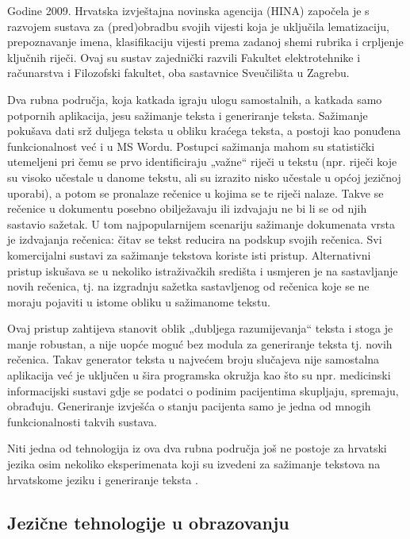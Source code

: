\begin{multicols}{2}
Godine 2009. Hrvatska izvještajna novinska agencija (HINA) \cite{str25} započela je s razvojem sustava za (pred)obradbu svojih vijesti koja je uključila lematizaciju, prepoznavanje imena, klasifikaciju vijesti prema zadanoj shemi rubrika i crpljenje ključnih riječi. Ovaj su sustav zajednički razvili Fakultet elektrotehnike i računarstva \cite{str26} i Filozofski fakultet, oba sastavnice Sveučilišta u Zagrebu.

Dva rubna područja, koja katkada igraju ulogu samostalnih, a katkada samo potpornih aplikacija, jesu sažimanje teksta i generiranje teksta. Sažimanje pokušava dati srž duljega teksta u obliku kraćega teksta, a postoji kao ponuđena funkcionalnost već i u MS Wordu. Postupci sažimanja mahom su statistički utemeljeni pri čemu se prvo identificiraju „važne“ riječi u tekstu (npr. riječi koje su visoko učestale u danome tekstu, ali su izrazito nisko učestale u općoj jezičnoj uporabi), a potom se pronalaze rečenice u kojima se te riječi nalaze. Takve se rečenice u dokumentu posebno obilježavaju ili izdvajaju ne bi li se od njih sastavio sažetak. U tom najpopularnijem scenariju sažimanje dokumenata vrsta je izdvajanja rečenica: čitav se tekst reducira na podskup svojih rečenica. Svi komercijalni sustavi za sažimanje tekstova koriste isti pristup. Alternativni pristup iskušava se u nekoliko istraživačkih središta i usmjeren je na sastavljanje novih rečenica, tj. na izgradnju sažetka sastavljenog od rečenica koje se ne moraju pojaviti u istome obliku u sažimanome tekstu.


Ovaj pristup zahtijeva stanovit oblik „dubljega razumijevanja“ teksta i stoga je manje robustan, a nije uopće moguć bez modula za generiranje teksta tj. novih rečenica. Takav generator teksta u najvećem broju slučajeva nije samostalna aplikacija već je uključen u šira programska okružja kao što su npr. medicinski informacijski sustavi gdje se podatci o podinim pacijentima skupljaju, spremaju, obrađuju. Generiranje izvješća o stanju pacijenta samo je jedna od mnogih funkcionalnosti takvih sustava.

Niti jedna od tehnologija iz ova dva rubna područja još ne postoje za hrvatski jezika osim nekoliko eksperimenata koji su izvedeni za sažimanje tekstova na hrvatskome jeziku \cite{art5} i generiranje teksta \cite{art6}. 


\subsection{Jezične tehnologije u obrazovanju}


\end{multicols}
